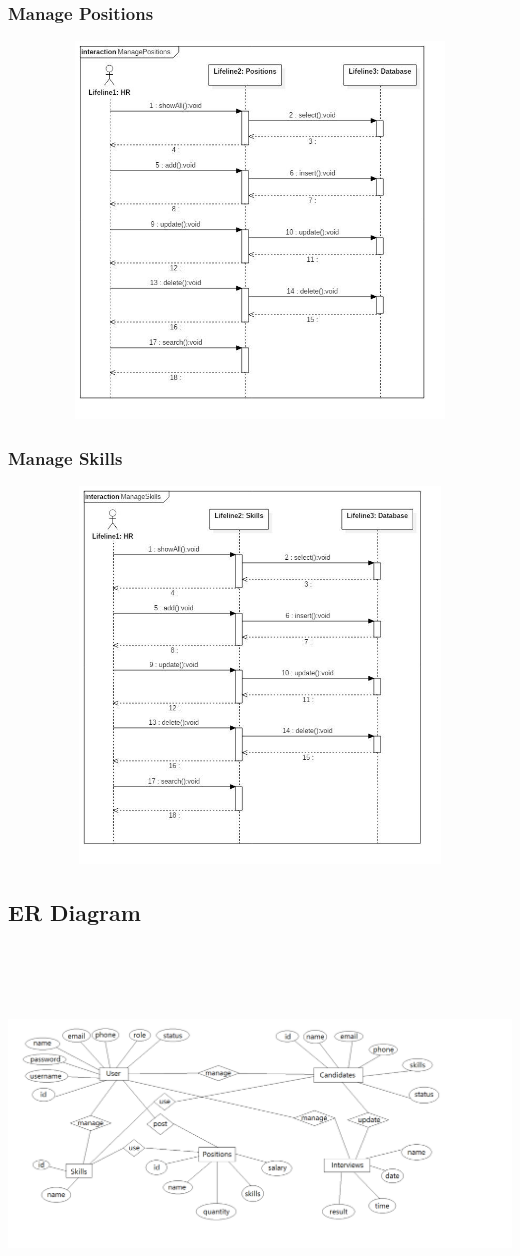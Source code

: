 \documentclass[a4paper]{article}
\begin{document}
\subsubsection{Manage Positions}
\includegraphics[width=15cm, height=10cm]{Diagram/ManagePos} \\
\subsubsection{Manage Skills}
\includegraphics[width=15cm, height=10cm]{Diagram/ManageSkill} \\
\subsection{ER Diagram}
\includegraphics[width=15cm, height=10cm]{Diagram/ERD} \\
\end{document}
